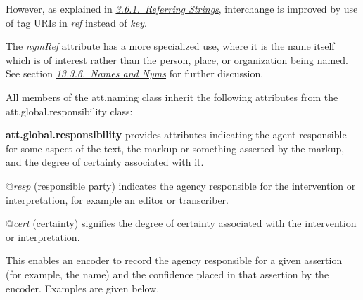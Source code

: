 However, as explained in \textit{\hyperref[CONARS]{3.6.1.\ Referring Strings}}, interchange is improved by use of tag URIs in {\itshape ref} instead of {\itshape key}.\par
The {\itshape nymRef} attribute has a more specialized use, where it is the name itself which is of interest rather than the person, place, or organization being named. See section \textit{\hyperref[NDNYM]{13.3.6.\ Names and Nyms}} for further discussion.\par
All members of the \textsf{att.naming} class inherit the following attributes from the \textsf{att.global.responsibility} class: 
\begin{sansreflist}
  
\item [\textbf{att.global.responsibility}] provides attributes indicating the agent responsible for some aspect of the text, the markup or something asserted by the markup, and the degree of certainty associated with it.\hfil\\[-10pt]\begin{sansreflist}
    \item[@{\itshape resp}]
  (responsible party) indicates the agency responsible for the intervention or interpretation, for example an editor or transcriber.
    \item[@{\itshape cert}]
  (certainty) signifies the degree of certainty associated with the intervention or interpretation.
\end{sansreflist}  
\end{sansreflist}
 This enables an encoder to record the agency responsible for a given assertion (for example, the name) and the confidence placed in that assertion by the encoder. Examples are given below.

